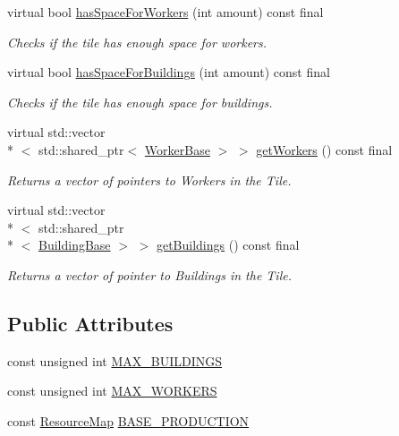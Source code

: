 \begin{DoxyCompactItemize}
virtual bool \hyperlink{classCourse_1_1TileBase_aae6c4d2e91f42fc16e5b622ae9c8b0de}{has\-Space\-For\-Workers} (int amount) const final
\begin{DoxyCompactList}\small\item\em Checks if the tile has enough space for workers. \end{DoxyCompactList}\item 
virtual bool \hyperlink{classCourse_1_1TileBase_aefed0bd9cf73d04e123d31e0e3935f6d}{has\-Space\-For\-Buildings} (int amount) const final
\begin{DoxyCompactList}\small\item\em Checks if the tile has enough space for buildings. \end{DoxyCompactList}\item 
virtual std\-::vector\\*
$<$ std\-::shared\-\_\-ptr$<$ \hyperlink{classCourse_1_1WorkerBase}{Worker\-Base} $>$ $>$ \hyperlink{classCourse_1_1TileBase_a1236e96c0a4e745f8f2e56933d09b52a}{get\-Workers} () const final
\begin{DoxyCompactList}\small\item\em Returns a vector of pointers to Workers in the Tile. \end{DoxyCompactList}\item 
virtual std\-::vector\\*
$<$ std\-::shared\-\_\-ptr\\*
$<$ \hyperlink{classCourse_1_1BuildingBase}{Building\-Base} $>$ $>$ \hyperlink{classCourse_1_1TileBase_a95790d2cf8c86b96a3bfaf4958becfd5}{get\-Buildings} () const final
\begin{DoxyCompactList}\small\item\em Returns a vector of pointer to Buildings in the Tile. \end{DoxyCompactList}\end{DoxyCompactItemize}
\subsection*{Public Attributes}
\begin{DoxyCompactItemize}
\item 
const unsigned int \hyperlink{classCourse_1_1TileBase_a1c968e242544a994bfd54f73cd9027ea}{M\-A\-X\-\_\-\-B\-U\-I\-L\-D\-I\-N\-G\-S}
\item 
const unsigned int \hyperlink{classCourse_1_1TileBase_aebadbc88dff462405047769cab680909}{M\-A\-X\-\_\-\-W\-O\-R\-K\-E\-R\-S}
\item 
const \hyperlink{namespaceCourse_ab9a46ed9cd00485e318e5731ea2f78d9}{Resource\-Map} \hyperlink{classCourse_1_1TileBase_a62cd84d3705c6cca9afd0cb992dd4f02}{B\-A\-S\-E\-\_\-\-P\-R\-O\-D\-U\-C\-T\-I\-O\-N}
\end{DoxyCompactItemize}
